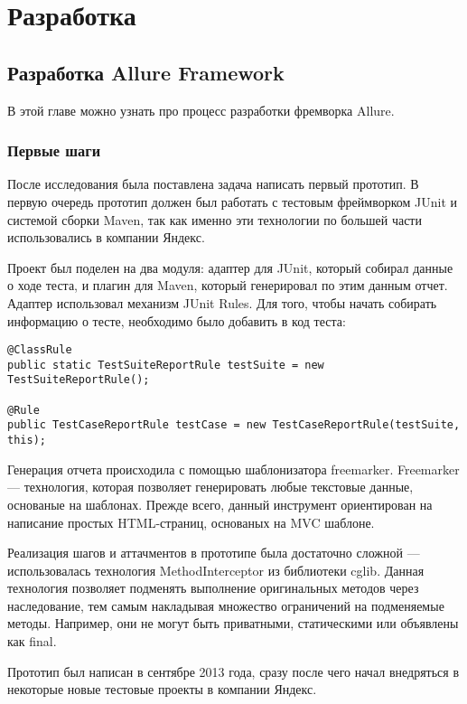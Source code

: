 \chapter{Разработка} 
\label{chapter3}

\section{Разработка Allure Framework}

В этой главе можно узнать про процесс разработки фремворка Allure.

\subsection{Первые шаги}

После исследования была поставлена задача написать первый прототип. В первую очередь прототип должен был работать с тестовым фреймворком JUnit и системой сборки Maven, так как именно эти технологии по большей части использовались в компании Яндекс. 

Проект был поделен на два модуля: адаптер для JUnit, который собирал данные о ходе теста, и плагин для Maven, который генерировал по этим данным отчет. Адаптер использовал механизм JUnit Rules. Для того, чтобы начать собирать информацию о тесте, необходимо было добавить в код теста:

\begin{lstlisting}
@ClassRule
public static TestSuiteReportRule testSuite = new TestSuiteReportRule();

@Rule
public TestCaseReportRule testCase = new TestCaseReportRule(testSuite, this);
\end{lstlisting}


Генерация отчета происходила с помощью шаблонизатора freemarker. Freemarker --- технология, которая позволяет генерировать любые текстовые данные, основаные на шаблонах. Прежде всего, данный инструмент ориентирован на написание простых HTML-страниц, основаных на MVC шаблоне.

Реализация шагов и аттачментов в прототипе была достаточно сложной --- использовалась технология MethodInterceptor из библиотеки cglib. Данная технология позволяет подменять выполнение оригинальных методов через наследование, тем самым накладывая множество ограничений на подменяемые методы. Например, они не могут быть приватными, статическими или объявлены как final. 

Прототип был написан в сентябре 2013 года, сразу после чего начал внедряться в некоторые новые тестовые проекты в компании Яндекс.

